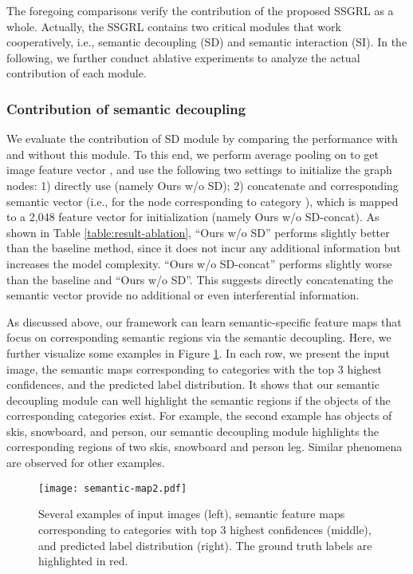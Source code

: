 \documentclass[10pt,twocolumn,letterpaper]{article}
\begin{document}
The foregoing comparisons verify the contribution of the proposed SSGRL as a whole. Actually, the SSGRL contains two critical modules that work cooperatively, i.e., semantic decoupling (SD) and semantic interaction (SI). In the following, we further conduct ablative experiments to analyze the actual contribution of each module.



\subsubsection{Contribution of semantic decoupling}
We evaluate the contribution of SD module by comparing the performance with and without this module. To this end, we perform average pooling on  to get image feature vector , and use the following two settings to initialize the graph nodes: 1) directly use  (namely Ours w/o SD); 2) concatenate  and corresponding semantic vector (i.e.,  for the node corresponding to category ), which is mapped to a 2,048 feature vector for initialization (namely Ours w/o SD-concat). As shown in Table \ref{table:result-ablation}, ``Ours w/o SD'' performs slightly better than the baseline method, since it does not incur any additional information but increases the model complexity. ``Ours w/o SD-concat'' performs slightly worse than the baseline and ``Ours w/o SD''. This suggests directly concatenating the semantic vector provide no additional or even interferential information.



As discussed above, our framework can learn semantic-specific feature maps that focus on corresponding semantic regions via the semantic decoupling. Here, we further visualize some examples in Figure \ref{fig:semantic-map}. In each row, we present the input image, the semantic maps corresponding to categories with the top 3 highest confidences, and the predicted label distribution. It shows that our semantic decoupling module can well highlight the semantic regions if the objects of the corresponding categories exist. For example, the second example has objects of skis, snowboard, and person, our semantic decoupling module highlights the corresponding regions of two skis, snowboard and person leg. Similar phenomena are observed for other examples.

\begin{figure}[!t]
   \centering
   \texttt{[image: semantic-map2.pdf]} \caption{Several examples of input images (left), semantic feature maps corresponding to categories with top 3 highest confidences (middle), and predicted label distribution (right). The ground truth labels are highlighted in red.}
   \label{fig:semantic-map}
   \vspace{-8pt}
\end{figure}
\end{document}
